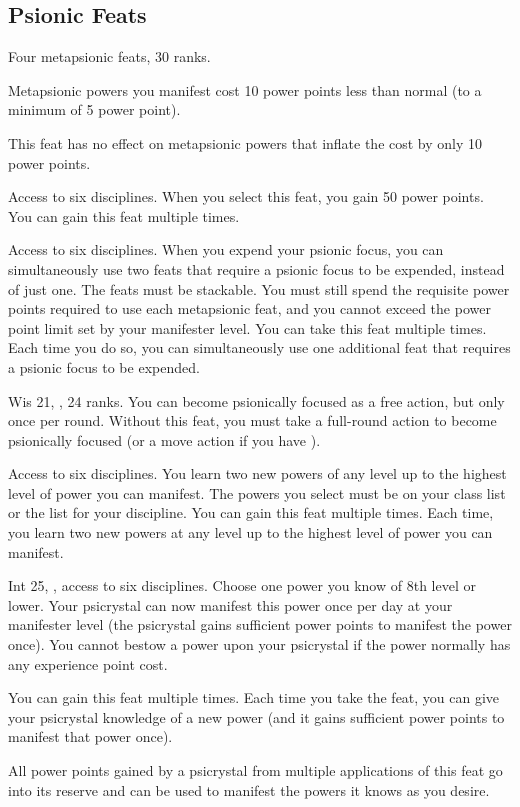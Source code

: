\subsection{Psionic Feats}
{Four metapsionic feats,  30 ranks.}
{Metapsionic powers you manifest cost 10 power points less than normal (to a minimum of 5 power point).

This feat has no effect on metapsionic powers that inflate the cost by only 10 power points.}

{}
{Access to six disciplines.}
{When you select this feat, you gain 50 power points.}
{}{You can gain this feat multiple times.}

{}
{Access to six disciplines.}
{When you expend your psionic focus, you can simultaneously use two feats that require a psionic focus to be expended, instead of just one. The feats must be stackable. You must still spend the requisite power points required to use each metapsionic feat, and you cannot exceed the power point limit set by your manifester level.}
{}{You can take this feat multiple times. Each time you do so, you can simultaneously use one additional feat that requires a psionic focus to be expended.}

{}
{Wis 21, ,  24 ranks.}
{You can become psionically focused as a free action, but only once per round.}
{Without this feat, you must take a full-round action to become psionically focused (or a move action if you have ).}
{}

{}
{Access to six disciplines.}
{You learn two new powers of any level up to the highest level of power you can manifest. The powers you select must be on your class list or the list for your discipline.}
{}{You can gain this feat multiple times. Each time, you learn two new powers at any level up to the highest level of power you can manifest.}

{}
{Int 25, , access to six disciplines.}
{Choose one power you know of 8th level or lower. Your psicrystal can now manifest this power once per day at your manifester level (the psicrystal gains sufficient power points to manifest the power once). You cannot bestow a power upon your psicrystal if the power normally has any experience point cost.}
{}{You can gain this feat multiple times. Each time you take the feat, you can give your psicrystal knowledge of a new power (and it gains sufficient power points to manifest that power once).

All power points gained by a psicrystal from multiple applications of this feat go into its reserve and can be used to manifest the powers it knows as you desire.
}
